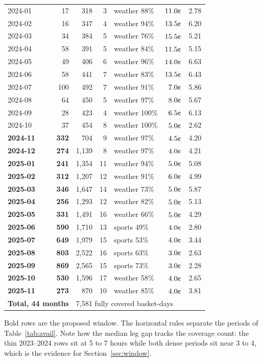 \documentclass[11pt,a4paper]{article}
\newcommand{\cent}{\text{\textcent}}
\begin{document}
{\begin{longtable}{lrrrlrr}
2024-01 & 17 & 318 & 3 & weather 88\% & $11.0\cent$ & 2.78 \\
2024-02 & 16 & 347 & 4 & weather 94\% & $13.5\cent$ & 6.20 \\
2024-03 & 34 & 384 & 5 & weather 76\% & $15.5\cent$ & 5.21 \\
2024-04 & 58 & 391 & 5 & weather 84\% & $11.5\cent$ & 5.15 \\
2024-05 & 49 & 406 & 6 & weather 96\% & $14.0\cent$ & 6.63 \\
2024-06 & 58 & 441 & 7 & weather 83\% & $13.5\cent$ & 6.43 \\
2024-07 & 100 & 492 & 7 & weather 91\% & $7.0\cent$ & 5.86 \\
2024-08 & 64 & 450 & 5 & weather 97\% & $8.0\cent$ & 5.67 \\
2024-09 & 28 & 423 & 4 & weather 100\% & $6.5\cent$ & 6.13 \\
2024-10 & 37 & 454 & 8 & weather 100\% & $5.0\cent$ & 2.62 \\
\midrule
\textbf{2024-11} & \textbf{332} & 704 & 9 & weather 97\% & $4.5\cent$ & 4.20 \\
\textbf{2024-12} & \textbf{274} & 1{,}139 & 8 & weather 97\% & $4.0\cent$ & 4.21 \\
\textbf{2025-01} & \textbf{241} & 1{,}354 & 11 & weather 94\% & $5.0\cent$ & 5.08 \\
\textbf{2025-02} & \textbf{312} & 1{,}207 & 12 & weather 91\% & $6.0\cent$ & 4.99 \\
\textbf{2025-03} & \textbf{346} & 1{,}647 & 14 & weather 73\% & $5.0\cent$ & 5.87 \\
\textbf{2025-04} & \textbf{256} & 1{,}293 & 12 & weather 82\% & $5.0\cent$ & 5.13 \\
\textbf{2025-05} & \textbf{331} & 1{,}491 & 16 & weather 66\% & $5.0\cent$ & 4.29 \\
\textbf{2025-06} & \textbf{590} & 1{,}710 & 13 & sports 49\% & $4.0\cent$ & 2.80 \\
\textbf{2025-07} & \textbf{649} & 1{,}979 & 15 & sports 53\% & $4.0\cent$ & 3.44 \\
\textbf{2025-08} & \textbf{803} & 2{,}522 & 16 & sports 63\% & $3.0\cent$ & 2.63 \\
\textbf{2025-09} & \textbf{869} & 2{,}565 & 15 & sports 73\% & $3.0\cent$ & 2.28 \\
\textbf{2025-10} & \textbf{530} & 1{,}596 & 17 & weather 58\% & $4.0\cent$ & 2.65 \\
\textbf{2025-11} & \textbf{273} & 870 & 10 & weather 85\% & $4.0\cent$ & 3.81 \\
\midrule
\multicolumn{2}{l}{\textbf{Total, 44 months}} & \multicolumn{5}{l}{7,581 fully covered basket-days} \\
\end{longtable}}

\noindent Bold rows are the proposed window. The horizontal rules separate the
periods of Table~\ref{tab:avail}. Note how the median leg gap tracks the coverage
count: the thin 2023--2024 rows sit at 5 to 7 hours while both dense periods
sit near 3 to 4, which is the evidence for Section~\ref{sec:window}.
\end{document}
